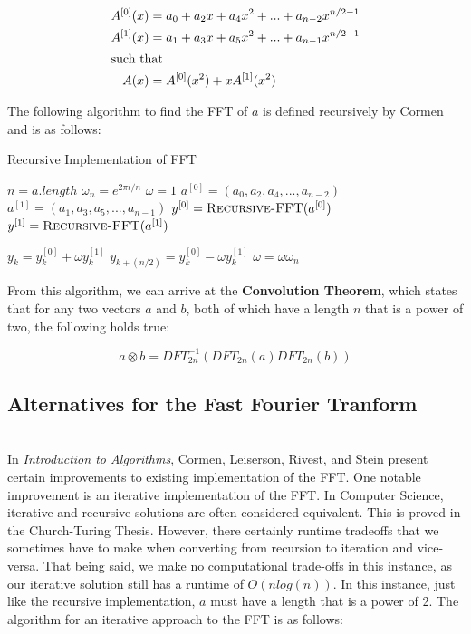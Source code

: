 \documentclass{amsproc}
\begin{document}
\begin{align*}
A^{[0]}(x) &= a_0 + a_2x + a_4x^2 + ... + a_{n-2}x^{n/2 - 1} \\
A^{[1]}(x) &= a_1 + a_3x + a_5x^2 + ... + a_{n-1}x^{n/2 - 1} \\
\intertext{such that}
A(x) &= A^{[0]}(x^2) + xA^{[1]}(x^2)
\end{align*}

The following algorithm to find the FFT of $a$ is defined recursively by Cormen and is as follows:

\begin{algorithm}
\caption{Recursive Implementation of FFT}\label{fft}
\begin{algorithmic}[1]
 
\State $n = a.length$
  
\EndIf
\State $\omega_n = e^{2\pi i / n}$ 
\State $\omega = 1$
\State $a^{[0]} = (a_0, a_2, a_4, ..., a_{n-2})$ 
\State $a^{[1]} = (a_1, a_3, a_5, ..., a_{n-1})$
\State $y^{[0]} = \Call{Recursive-FFT}{a^{[0]}}$ 
\State $y^{[1]} = \Call{Recursive-FFT}{a^{[1]}}$

	\State $y_k = y_k^{[0]} + \omega y_k^{[1]}$ 
	\State $y_{k+(n/2)} = y_k^{[0]} - \omega y_k^{[1]}$
	\State $\omega = \omega \omega_n$ 
\EndFor

\State {} 

\EndProcedure
\end{algorithmic}
\end{algorithm}

From this algorithm, we can arrive at the \textbf{Convolution Theorem}, which states that for any two vectors $a$ and $b$, both of which have a length $n$ that is a power of two, the following holds true:

$$
a \otimes b = DFT_{2n}^{-1}(DFT_{2n}(a) DFT_{2n}(b))
$$

\subsection{Alternatives for the Fast Fourier Tranform}

\mbox{}	 \\
\indent In \textit{Introduction to Algorithms}, Cormen, Leiserson, Rivest, and Stein present certain improvements to existing implementation of the FFT. One notable improvement is an iterative implementation of the FFT. In Computer Science, iterative and recursive solutions are often considered equivalent. This is proved in the Church-Turing Thesis. However, there certainly runtime tradeoffs that we sometimes have to make when converting from recursion to iteration and vice-versa. That being said, we make no computational trade-offs in this instance, as our iterative solution still has a runtime of $O(nlog(n))$. In this instance, just like the recursive implementation, $a$ must have a length that is a power of 2. The algorithm for an iterative approach to the FFT is as follows:
\end{document}
